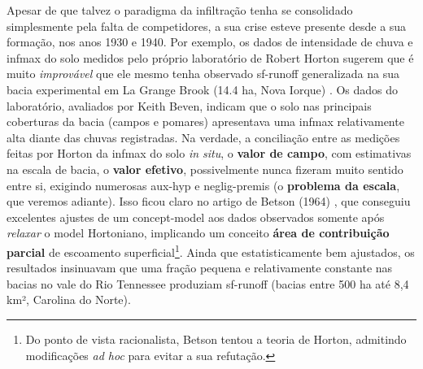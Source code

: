 \documentclass[./main.tex]{subfiles}
\begin{document}
\par Apesar de que talvez o \gls{paradigma} da infiltração tenha se consolidado simplesmente pela falta de competidores, a sua crise esteve presente desde a sua formação, nos anos 1930 e 1940. Por exemplo, os dados de intensidade de chuva e \gls{infmax} do solo medidos pelo próprio laboratório de Robert Horton sugerem que é muito \textit{improvável} que ele mesmo tenha observado \gls{sf-runoff} generalizada na sua bacia experimental em La Grange Brook (14.4 ha, Nova Iorque) \cite{Beven2004c}. Os dados do laboratório, avaliados por Keith Beven, indicam que o solo nas principais coberturas da bacia (campos e pomares) apresentava uma \gls{infmax} relativamente alta diante das chuvas registradas. Na verdade, a conciliação entre as medições feitas por Horton da \gls{infmax} do solo \textit{in situ}, o \textbf{valor de campo}, com estimativas na escala de bacia, o \textbf{valor efetivo}, possivelmente nunca fizeram muito sentido entre si, exigindo numerosas \gls{aux-hyp} e \gls{neglig-premis} (o \textbf{problema da escala}, que veremos adiante). Isso ficou claro no artigo de Betson (1964) \cite{Betson1964}, que conseguiu excelentes ajustes de um \gls{concept-model} aos dados observados somente após \textit{relaxar} o \gls{model} Hortoniano, implicando um conceito \textbf{área de contribuição parcial} de escoamento superficial\footnote{Do ponto de vista racionalista, Betson tentou  a \gls{teoria} de Horton, admitindo modificações \textit{ad hoc} para evitar a sua refutação.}. Ainda que estatisticamente bem ajustados, os resultados insinuavam que uma fração pequena e relativamente constante nas bacias no vale do Rio Tennessee produziam \gls{sf-runoff} (bacias entre 500 ha até 8,4 km², Carolina do Norte).
\end{document}
